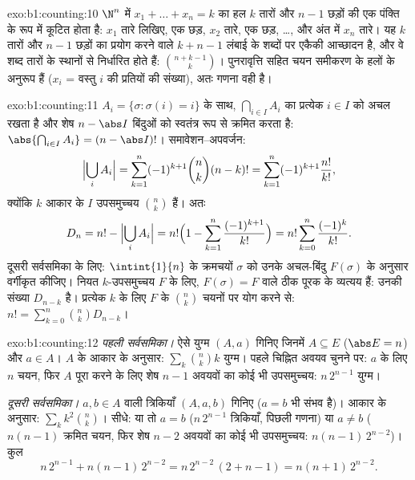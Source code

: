 \begin{solution}{exo:b1:counting:10}
$\N^n$ में $x_1 + \dots + x_n = k$ का हल $k$ तारों और $n - 1$ छड़ों की एक
पंक्ति के रूप में कूटित होता है: $x_1$ तारे लिखिए, एक छड़, $x_2$ तारे, एक
छड़, \dots, और अंत में $x_n$ तारे। यह $k$ तारों और $n - 1$ छड़ों का प्रयोग
करने वाले $k + n - 1$ लंबाई के शब्दों पर एकैकी आच्छादन है, और वे शब्द तारों
के स्थानों से निर्धारित होते हैं: $\binom{n + k - 1}{k}$। पुनरावृत्ति सहित
चयन समीकरण के हलों के अनुरूप हैं ($x_i$ = वस्तु $i$ की प्रतियों की संख्या),
अतः गणना वही है।
\end{solution}

\begin{solution}{exo:b1:counting:11}
$A_i = \{\sigma : \sigma(i) = i\}$ के साथ, $\bigcap_{i \in I} A_i$ का 
प्रत्येक $i \in I$ को अचल रखता है और शेष $n - \abs I$ बिंदुओं को स्वतंत्र
रूप से क्रमित करता है: $\abs{\bigcap_{i \in I} A_i} = (n - \abs I)!$।
समावेशन--अपवर्जन:
\[
\Bigl|\bigcup_i A_i\Bigr|
= \sum_{k=1}^{n} (-1)^{k+1} \binom nk (n-k)!
= \sum_{k=1}^{n} (-1)^{k+1} \frac{n!}{k!} ,
\]
क्योंकि $k$ आकार के $I$ उपसमुच्चय $\binom nk$ हैं। अतः
\[
D_n = n! - \Bigl|\bigcup_i A_i\Bigr|
= n!\Bigl(1 - \sum_{k=1}^{n} \frac{(-1)^{k+1}}{k!}\Bigr)
= n! \sum_{k=0}^{n} \frac{(-1)^k}{k!} .
\]
दूसरी सर्वसमिका के लिए: $\intint{1}{n}$ के क्रमचयों $\sigma$ को उनके
अचल-बिंदु  $F(\sigma)$ के अनुसार वर्गीकृत कीजिए। नियत $k$-उपसमुच्चय
$F$ के लिए, $F(\sigma) = F$ वाले  ठीक पूरक के व्यत्यय हैं: उनकी संख्या
$D_{n-k}$ है। प्रत्येक $k$ के लिए $F$ के $\binom nk$ चयनों पर योग करने से:
$n! = \sum_{k=0}^{n} \binom nk D_{n-k}$।
\end{solution}

\begin{solution}{exo:b1:counting:12}
\emph{पहली सर्वसमिका।} ऐसे युग्म $(A, a)$ गिनिए जिनमें $A \subseteq E$
($\abs E = n$) और $a \in A$। $A$ के आकार के अनुसार: $\sum_k \binom nk k$
युग्म। पहले चिह्नित अवयव चुनने पर: $a$ के लिए $n$ चयन, फिर $A$ पूरा करने के
लिए शेष $n - 1$ अवयवों का कोई भी उपसमुच्चय: $n\,2^{n-1}$ युग्म।

\emph{दूसरी सर्वसमिका।} $a, b \in A$ वाली त्रिकियाँ $(A, a, b)$ गिनिए ($a =
b$ भी संभव है)। आकार के अनुसार: $\sum_k k^2 \binom nk$। सीधे: या तो $a = b$
($n\,2^{n-1}$ त्रिकियाँ, पिछली गणना) या $a \neq b$ ($n(n-1)$ क्रमित चयन, फिर
शेष $n - 2$ अवयवों का कोई भी उपसमुच्चय: $n(n-1)\,2^{n-2}$)। कुल
\[
n\,2^{n-1} + n(n-1)\,2^{n-2} = n\,2^{n-2}\,(2 + n - 1)
= n(n+1)\,2^{n-2} .
\]
\end{solution}

